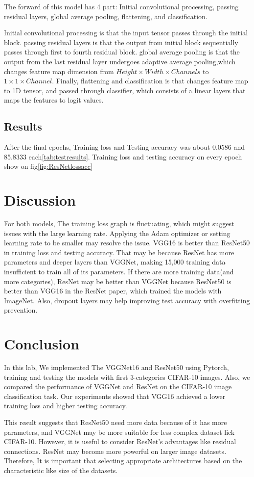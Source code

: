 \documentclass[extendedabs]{bmvc2k}
\begin{document}
The forward of this model has 4 part: Initial convolutional processing, passing residual layers, global average pooling, flattening, and classification.

Initial convolutional processing is that the input tensor passes through the initial block. passing residual layers is that the output from initial block sequentially passes through first to fourth residual block. global average pooling is that the output from the last residual layer undergoes adaptive average pooling,which changes feature map dimension from $Height\times Width \times Channels$ to $1\times1\times Channel$. Finally, flattening and classification is that changes feature map to 1D tensor, and passed through classifier, which consists of a linear layers that maps the features to logit values.

\subsection{Results}
After the final epochs, Training loss and Testing accuracy was about 0.0586 and 85.8333 each\ref{tab:testresults}. Training loss and testing accuracy on every epoch show on fig\ref{fig:ResNetlossacc}

\section{Discussion}
For both models, The training loss graph is fluctuating, which might suggest issues with the large learning rate. Applying the Adam optimizer\cite{adamopt} or setting learning rate to be smaller may resolve the issue. VGG16 is better than ResNet50 in training loss and testing accuracy. That may be because ResNet has more parameters and deeper layers than VGGNet, making 15,000 training data insufficient to train all of its parameters. If there are more training data(and more categories), ResNet may be better than VGGNet because ResNet50 is better than VGG16 in the ResNet paper\cite{resnet_paper}, which trained the models with ImageNet. Also, dropout layers may help improving test accuracy with overfitting prevention.
\section{Conclusion}
In this lab, We implemented The VGGNet16 and ResNet50 using Pytorch, training and testing the models with first 3-categories CIFAR-10 images. Also, we compared the performance of VGGNet and ResNet on the CIFAR-10 image classification task. Our experiments showed that VGG16 achieved a lower training loss and higher testing accuracy.

This result suggests that ResNet50 need more data because of it has more parameters, and VGGNet may be more suitable for less complex dataset lick CIFAR-10. However, it is useful to consider ResNet's advantages like residual connections. ResNet may become more powerful on larger image datasets. Therefore, It is important that selecting appropriate architectures based on the characteristic like size of the datasets.

\newpage

\end{document}
